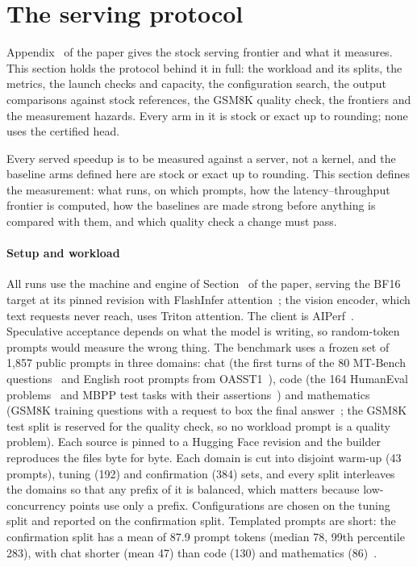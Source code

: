 \section{The serving protocol}\label{notes:serving}
Appendix~ of the paper gives the stock serving frontier and what it measures. This section holds the protocol behind it in full: the workload and its splits, the metrics, the launch checks and capacity, the configuration search, the output comparisons against stock references, the GSM8K quality check, the frontiers and the measurement hazards. Every arm in it is stock or exact up to rounding; none uses the certified head.

Every served speedup is to be measured against a server, not a kernel, and the baseline arms defined here are stock or exact up to rounding. This section defines the measurement: what runs, on which prompts, how the latency--throughput frontier is computed, how the baselines are made strong before anything is compared with them, and which quality check a change must pass.

\paragraph{Setup and workload}\label{sec:serving-setup} All runs use the machine and engine of Section~ of the paper, serving the BF16 target at its pinned revision with FlashInfer attention~\cite{flashinfer}; the vision encoder, which text requests never reach, uses Triton attention. The client is AIPerf~\cite{aiperf}. Speculative acceptance depends on what the model is writing, so random-token prompts would measure the wrong thing. The benchmark uses a frozen set of 1,857 public prompts in three domains: chat (the first turns of the 80 MT-Bench questions~\cite{mtbench} and English root prompts from OASST1~\cite{oasst1}), code (the 164 HumanEval problems~\cite{humaneval} and MBPP test tasks with their assertions~\cite{mbpp}) and mathematics (GSM8K training questions with a request to box the final answer~\cite{gsm8k}; the GSM8K test split is reserved for the quality check, so no workload prompt is a quality problem). Each source is pinned to a Hugging Face revision and the builder reproduces the files byte for byte. Each domain is cut into disjoint warm-up (43 prompts), tuning (192) and confirmation (384) sets, and every split interleaves the domains so that any prefix of it is balanced, which matters because low-concurrency points use only a prefix. Configurations are chosen on the tuning split and reported on the confirmation split. Templated prompts are short: the confirmation split has a mean of 87.9 prompt tokens (median 78, 99th percentile 283), with chat shorter (mean 47) than code (130) and mathematics (86)~.

